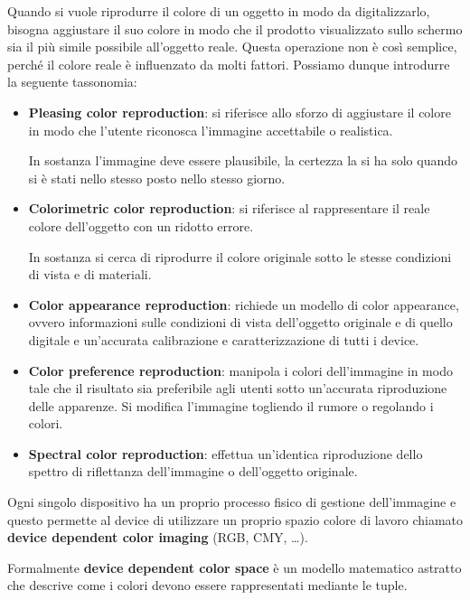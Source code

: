 Quando si vuole riprodurre il colore di un oggetto in modo da digitalizzarlo,
bisogna aggiustare il suo colore in modo che il prodotto visualizzato sullo
schermo sia il più simile possibile all'oggetto reale.
Questa operazione non è così semplice, perché il colore reale è influenzato da
molti fattori. Possiamo dunque introdurre la seguente tassonomia:
\begin{itemize}
    \item \textbf{Pleasing color reproduction}: si riferisce allo sforzo di
          aggiustare il colore in modo che l'utente riconosca l'immagine
          accettabile o realistica.

          In sostanza l'immagine deve essere plausibile, la certezza la si ha
          solo quando si è stati nello stesso posto nello stesso giorno.
    \item \textbf{Colorimetric color reproduction}: si riferisce al rappresentare
          il reale colore dell'oggetto con un ridotto errore.

          In sostanza si cerca di riprodurre il colore originale sotto le stesse
          condizioni di vista e di materiali.
    \item \textbf{Color appearance reproduction}: richiede un modello di color
          appearance, ovvero informazioni sulle condizioni di vista dell'oggetto
          originale e di quello digitale e un'accurata calibrazione e
          caratterizzazione di tutti i device.
    \item \textbf{Color preference reproduction}: manipola i colori dell'immagine
          in modo tale che il risultato sia preferibile agli utenti sotto
          un'accurata riproduzione delle apparenze. Si modifica l'immagine
          togliendo il rumore o regolando i colori.
    \item \textbf{Spectral color reproduction}: effettua un'identica riproduzione
          dello spettro di riflettanza dell'immagine o dell'oggetto originale.
\end{itemize}

Ogni singolo dispositivo ha un proprio processo fisico di gestione dell'immagine
e questo permette al device di utilizzare un proprio spazio colore di lavoro
chiamato \textbf{device dependent color imaging} (RGB, CMY, \dots).

\begin{definizione}
    Formalmente \textbf{device dependent color space} è un modello matematico
    astratto che descrive come i colori devono essere rappresentati mediante le
    tuple.
\end{definizione}

